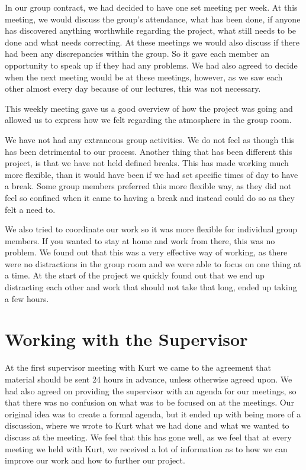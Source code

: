 In our group contract, we had decided to have one set meeting per week.
At this meeting, we would discuss the group's attendance, what has been done, if anyone has discovered anything worthwhile regarding the project, what still needs to be done and what needs correcting. 
At these meetings we would also discuss if there had been any discrepancies within the group.
So it gave each member an opportunity to speak up if they had any problems.
We had also agreed to decide when the next meeting would be at these meetings, however, as we saw each other almost every day because of our lectures, this was not necessary.

This weekly meeting gave us a good overview of how the project was going and allowed us to express how we felt regarding the atmosphere in the group room. 

We have not had any extraneous group activities. 
We do not feel as though this has been detrimental to our process.
Another thing that has been different this project, is that we have not held defined breaks. 
This has made working much more flexible, than it would have been if we had set specific times of day to have a break. 
Some group members preferred this more flexible way, as they did not feel so confined when it came to having a break and instead could do so as they felt a need to.

We also tried to coordinate our work so it was more flexible for individual group members.
If you wanted to stay at home and work from there, this was no problem.
We found out that this was a very effective way of working, as there were no distractions in the group room and we were able to focus on one thing at a time.
At the start of the project we quickly found out that we end up distracting each other and work that should not take that long, ended up taking a few hours.

\section{Working with the Supervisor}
At the first supervisor meeting with Kurt we came to the agreement that material should be sent 24 hours in advance, unless otherwise agreed upon. 
We had also agreed on providing the supervisor with an agenda for our meetings, so that there was no confusion on what was to be focused on at the meetings. 
Our original idea was to create a formal agenda, but it ended up with being more of a discussion, where we wrote to Kurt what we had done and what we wanted to discuss at the meeting. 
We feel that this has gone well, as we feel that at every meeting we held with Kurt, we received a lot of information as to how we can improve our work and how to further our project.

